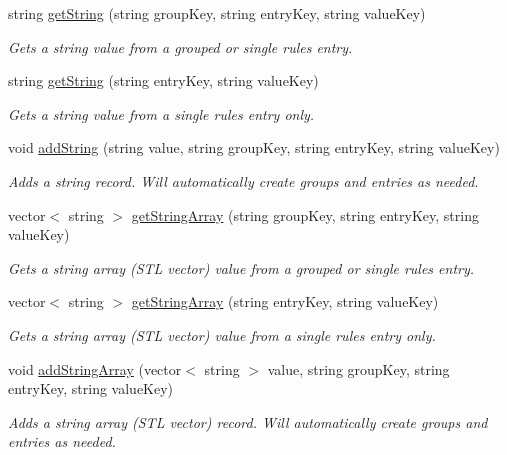 \begin{DoxyCompactItemize}
string \hyperlink{class_rules_1_1_rules_container_ad8a93e5441719e6f52239cc56500eb3f}{get\-String} (string group\-Key, string entry\-Key, string value\-Key)
\begin{DoxyCompactList}\small\item\em Gets a string value from a grouped or single rules entry. \end{DoxyCompactList}\item 
string \hyperlink{class_rules_1_1_rules_container_affcb0dcb03e673c44a04baffa470edbf}{get\-String} (string entry\-Key, string value\-Key)
\begin{DoxyCompactList}\small\item\em Gets a string value from a single rules entry only. \end{DoxyCompactList}\item 
void \hyperlink{class_rules_1_1_rules_container_abf95f3b2bbd9133c24994b8c4bb656b0}{add\-String} (string value, string group\-Key, string entry\-Key, string value\-Key)
\begin{DoxyCompactList}\small\item\em Adds a string record. Will automatically create groups and entries as needed. \end{DoxyCompactList}\item 
vector$<$ string $>$ \hyperlink{class_rules_1_1_rules_container_aded0080ba412463b5bc6c19e6699292a}{get\-String\-Array} (string group\-Key, string entry\-Key, string value\-Key)
\begin{DoxyCompactList}\small\item\em Gets a string array (S\-T\-L vector) value from a grouped or single rules entry. \end{DoxyCompactList}\item 
vector$<$ string $>$ \hyperlink{class_rules_1_1_rules_container_a6d1fc8b4284cec7f1da4cc84d7fe74f2}{get\-String\-Array} (string entry\-Key, string value\-Key)
\begin{DoxyCompactList}\small\item\em Gets a string array (S\-T\-L vector) value from a single rules entry only. \end{DoxyCompactList}\item 
void \hyperlink{class_rules_1_1_rules_container_ac46075ef8f7d1b834dee76648a81a504}{add\-String\-Array} (vector$<$ string $>$ value, string group\-Key, string entry\-Key, string value\-Key)
\begin{DoxyCompactList}\small\item\em Adds a string array (S\-T\-L vector) record. Will automatically create groups and entries as needed. \end{DoxyCompactList}\item 

\end{DoxyCompactItemize}
